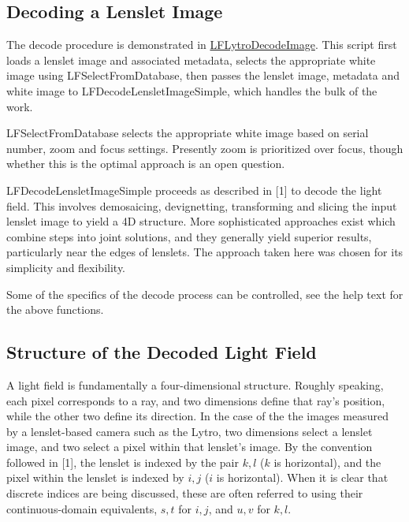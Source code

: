 \documentclass[onecolumn]{article}
\newcommand{\CiteFunc}[1]{\hyperlink{#1}{\small #1}}
\newcommand{\SupFunction}[1]{{\small #1}}
\begin{document}
\subsection{Decoding a Lenslet Image}

The decode procedure is demonstrated in \CiteFunc{LFLytroDecodeImage}. This script first loads a lenslet image and associated metadata, selects the appropriate white image using \SupFunction{LFSelectFromDatabase}, then passes the lenslet image, metadata and white image to \SupFunction{LFDecodeLensletImageSimple}, which handles the bulk of the work.

\SupFunction{LFSelectFromDatabase} selects the appropriate white image based on serial number, zoom and focus settings. Presently zoom is prioritized over focus, though whether this is the optimal approach is an open question.

\SupFunction{LFDecodeLensletImageSimple} proceeds as described in [1] to decode the light field. This involves demosaicing, devignetting, transforming and slicing the input lenslet image to yield a 4D structure. More sophisticated approaches exist which combine steps into joint solutions, and they generally yield superior results, particularly near the edges of lenslets. The approach taken here was chosen for its simplicity and flexibility.

Some of the specifics of the decode process can be controlled, see the help text for the above functions.

\subsection{Structure of the Decoded Light Field}

A light field is fundamentally a four-dimensional structure. Roughly speaking, each pixel corresponds to a ray, and two dimensions define that ray's position, while the other two define its direction. In the case of the the images measured by a lenslet-based camera such as the Lytro, two dimensions select a lenslet image, and two select a pixel within that lenslet's image. By the convention followed in [1], the lenslet is indexed by the pair $k, l$ ($k$ is horizontal), and the pixel within the lenslet is indexed by $i, j$ ($i$ is horizontal). When it is clear that discrete indices are being discussed, these are often referred to using their continuous-domain equivalents, $s,t$ for $i,j$, and $u,v$ for $k,l$.
\end{document}
